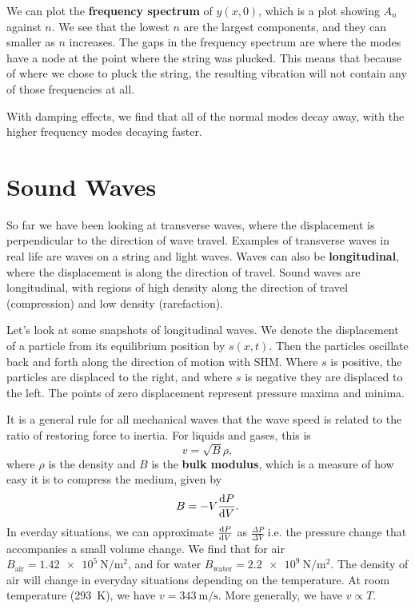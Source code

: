 \documentclass[../classical_mechanics.tex]{subfiles}
\begin{document}
            We can plot the \textbf{frequency spectrum} of $y(x,0)$, which is a plot showing $A_n$ against $n$.
            We see that the lowest $n$ are the largest components, and they can smaller as $n$ increases.
            The gaps in the frequency spectrum are where the modes have a node at the point where the string was plucked.
            This means that because of where we chose to pluck the string, the resulting vibration will not contain any of those frequencies at all.

            With damping effects, we find that all of the normal modes decay away, with the higher frequency modes decaying faster.

    \section{Sound Waves}\label{sec:sound-waves}
        So far we have been looking at transverse waves, where the displacement is perpendicular to the direction of wave travel.
        Examples of transverse waves in real life are waves on a string and light waves.
        Waves can also be \textbf{longitudinal}, where the displacement is along the direction of travel.
        Sound waves are longitudinal, with regions of high density along the direction of travel (compression) and low density (rarefaction).
        
        Let's look at some snapshots of longitudinal waves.
        We denote the displacement of a particle from its equilibrium position by $s(x,t)$.
        Then the particles oscillate back and forth along the direction of motion with SHM.
        Where $s$ is positive, the particles are displaced to the right, and where $s$ is negative they are displaced to the left.
        The points of zero displacement represent pressure maxima and minima.

        It is a general rule for all mechanical waves that the wave speed is related to the ratio of restoring force to inertia.
        For liquids and gases, this is
        \begin{equation}
            v=\sqrt{B}{\rho},
        \end{equation}
        where $\rho$ is the density and $B$ is the \textbf{bulk modulus}, which is a measure of how easy it is to compress the medium, given by
        \begin{equation}
            B=-V\dv{P}{V}.
        \end{equation}
        In everday situations, we can approximate $\dv{P}{V}$ as $\frac{\Delta P}{\Delta V}$ i.e. the pressure change that accompanies a small volume change.
        We find that for air $B_\text{air}=\qty{1.42e5}{\newton\per\meter\squared}$, and for water $B_\text{water}=\qty{2.2e9}{\newton\per\meter\squared}$.
        The density of air will change in everyday situations depending on the temperature.
        At room temperature (\qty{293}{\kelvin}), we have $v=\qty{343}{\meter\per\second}$.
        More generally, we have $v\propto T$.
\end{document}
